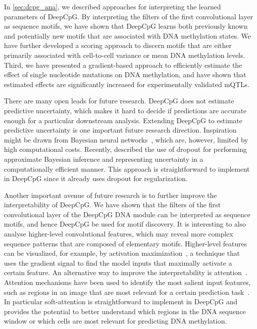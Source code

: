 In \cref{sec:dcpg_ana}, we described approaches for interpreting the learned parameters of DeepCpG. By interpreting the filters of the first convolutional layer as sequence motifs, we have shown that DeepCpG learns both previously known and potentially new motifs that are associated with DNA methylation states. We have further developed a scoring approach to discern motifs that are either primarily associated with cell-to-cell variance or mean DNA methylation levels. Third, we have presented a gradient-based approach to efficiently estimate the effect of single nucleotide mutations on DNA methylation, and have shown that estimated effects are significantly increased for experimentally validated mQTLs.

There are many open leads for future research. DeepCpG does not estimate predictive uncertainty, which makes it hard to decide if predictions are accurate enough for a particular downstream analysis. Extending DeepCpG to estimate predictive uncertainty is one important future research direction. Inspiration might be drawn from Bayesian neural networks~\citep{neal_bayesian_2012}, which are, however, limited by high computational costs. Recently, \citet{gal_dropout_2015-1} described the use of dropout for performing approximate Bayesian inference and representing uncertainty in a computationally efficient manner. This approach is straightforward to implement in DeepCpG since it already uses dropout for regularization.

Another important avenue of future research is to further improve the interpretability of DeepCpG. We have shown that the filters of the first convolutional layer of the DeepCpG DNA module can be interpreted as sequence motifs, and hence DeepCpG be used for motif discovery. It is interesting to also analyse higher-level convolutional features, which may reveal more complex sequence patterns that are composed of elementary motifs. Higher-level features can be visualized, for example, by activation maximization~\citep{mahendran_visualizing_2015}, a technique that uses the gradient signal to find the model inputs that maximally activate a certain feature. An alternative way to improve the interpretability is attention~\citep{cho_describing_2015}. Attention mechanisms have been used to identify the most salient input features, such as regions in an image that are most relevant for a certain prediction task~\citep{cho_describing_2015,xu_show_2015,sharma_action_2015}. In particular soft-attention is straightforward to implement in DeepCpG and provides the potential to better understand which regions in the DNA sequence window or which cells are most relevant for predicting DNA methylation.

